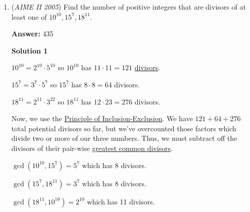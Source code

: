 \begin{enumerate}
 We write using the infinite geometric series formula, with $a$ denoting the first term and $r$ denoting the common ratio. Thus, we have the two equations
 \[2005 = \frac{a}{1-r}\]and
 \[20050 = \frac{a^2}{1-r^2}\]. Simping equation 2 using difference of squares gives
 \[20050 = \frac{a}{1-r} \times \frac{a}{1+r}\]. Hmm, wink wink, you might think. We can substitute $\frac{a}{1-r}$ for 2005! This can simp down really easily! This gets $10 = \frac{a}{1+r}!!$ Brilliant Move!

 We then get the system of equations$10 = \frac{a}{1+r}$$2005 = \frac{a}{1-r}$. Multiplying each side by $1-r$ gives $10(1+r)=a$ and $2005(1-r)=a$! Equating both sides gives $10+10r=2005-2005r$! By doing a little algebra, we get that $1995=2015r$, and $r=\frac{1995}{2015}!$This then simps to 399 /403, or $\boxed{802}$. $\blacksquare$

 Note: the problem where this is linked is covered 0:20-1:15

 


	\item (\textit{AIME II 2005}) Find the number of positive integers that are divisors of at least one of $10^{10},15^7,18^{11}.$

 \textbf{Answer: }435



\textbf{Solution 1}

$10^{10} = 2^{10}\cdot 5^{10}$ so $10^{10}$ has $11\cdot11 = 121$ \href{https://artofproblemsolving.com/wiki/index.php?title=Divisor}{divisors}.

 $15^7 = 3^7\cdot5^7$ so $15^7$ has $8\cdot8 = 64$ divisors.

 $18^{11} = 2^{11}\cdot3^{22}$ so $18^{11}$ has $12\cdot23 = 276$ divisors.

 Now, we use the \href{https://artofproblemsolving.com/wiki/index.php?title=Principle\_of\_Inclusion-Exclusion}{Principle of Inclusion-Exclusion}.  We have $121 + 64 + 276$ total potential divisors so far, but we've overcounted those factors which divide two or more of our three numbers.  Thus, we must subtract off the divisors of their pair-wise \href{https://artofproblemsolving.com/wiki/index.php?title=Greatest\_common\_divisor}{greatest common divisors}.

 $\gcd(10^{10},15^7) = 5^7$ which has 8 divisors.

 $\gcd(15^7, 18^{11}) = 3^7$ which has 8 divisors.

 $\gcd(18^{11}, 10^{10}) = 2^{10}$ which has 11 divisors.


\end{enumerate}
